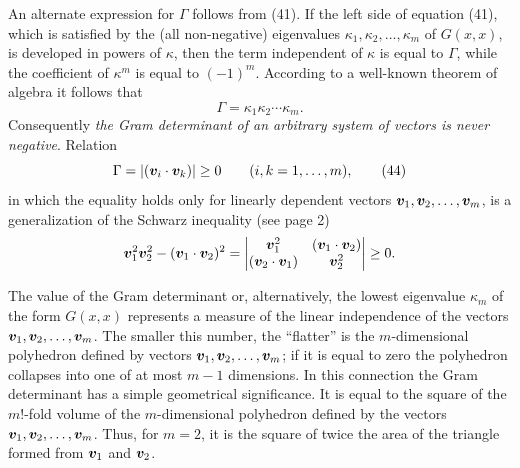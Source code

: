 An alternate expression for $\Gamma$ follows from (41). If the left side of equation (41), which is satisfied by the (all non-negative) eigenvalues $\kappa_1,\kappa_2,\ldots,\kappa_m$ of $G(x,x)$, is developed in powers of $\kappa$, then the term independent of $\kappa$ is equal to $\Gamma$, while the coefficient of $\kappa^m$ is equal to $(-1)^m$. According to a well-known theorem of algebra it follows that
\begin{equation*}\Gamma=\kappa_1\kappa_2\cdots\kappa_m. \tag{43}\end{equation*}
Consequently \emph{the Gram determinant of an arbitrary system of vectors is never negative}. Relation
\begin{equation*}\Gamma=\left|(\bm{v}_i\cdot\bm{v}_k)\right|\ge0\qquad(i,k=1,\ldots,m), \tag{44}\end{equation*}
in which the equality holds only for linearly dependent vectors $\bm{v}_1,\bm{v}_2,\ldots,\bm{v}_m$, is a generalization of the Schwarz inequality (see page 2)
\[
\bm{v}_1^2\bm{v}_2^2-(\bm{v}_1\cdot\bm{v}_2)^2=
\begin{vmatrix}\bm{v}_1^2&(\bm{v}_1\cdot\bm{v}_2)\\(\bm{v}_2\cdot\bm{v}_1)&\bm{v}_2^2\end{vmatrix}\ge0.
\]

The value of the Gram determinant or, alternatively, the lowest eigenvalue $\kappa_m$ of the form $G(x,x)$ represents a measure of the linear independence of the vectors $\bm{v}_1,\bm{v}_2,\ldots,\bm{v}_m$. The smaller this number, the ``flatter'' is the $m$-dimensional polyhedron defined by vectors $\bm{v}_1,\bm{v}_2,\ldots,\bm{v}_m$; if it is equal to zero the polyhedron collapses into one of at most $m-1$ dimensions. In this connection the Gram determinant has a simple geometrical significance. It is equal to the square of the $m!$-fold volume of the $m$-dimensional polyhedron defined by the vectors $\bm{v}_1,\bm{v}_2,\ldots,\bm{v}_m$. Thus, for $m=2$, it is the square of twice the area of the triangle formed from $\bm{v}_1$ and $\bm{v}_2$.

